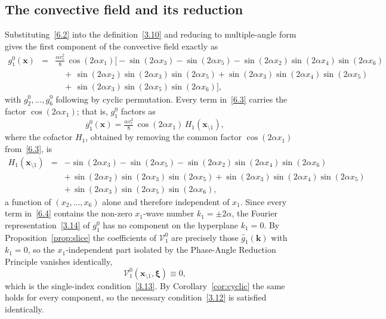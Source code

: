 \documentclass[11pt]{jfm}
\numberwithin{equation}{section}
\begin{document}
\subsection{The convective field and its reduction}
Substituting~\eqref{6.2} into the definition~\eqref{3.10} and reducing to multiple-angle form
gives the first component of the convective field exactly as
\begin{eqnarray}
\label{6.3}
g_1^0(\boldsymbol{x}) &=& \frac{\alpha v_r^2}{8}\,\cos(2\alpha x_1)\Big[
-\sin(2\alpha x_3)-\sin(2\alpha x_5)
-\sin(2\alpha x_2)\sin(2\alpha x_4)\sin(2\alpha x_6)\nonumber\\
&&\quad+\,\sin(2\alpha x_2)\sin(2\alpha x_3)\sin(2\alpha x_5)
+\sin(2\alpha x_3)\sin(2\alpha x_4)\sin(2\alpha x_5)\nonumber\\
&&\quad+\,\sin(2\alpha x_3)\sin(2\alpha x_5)\sin(2\alpha x_6)\Big],
\end{eqnarray}
with $g_2^0,\dots,g_6^0$ following by cyclic permutation. Every term in~\eqref{6.3} carries the
factor $\cos(2\alpha x_1)$; that is, $g_1^0$ factors as
\begin{equation}
\label{6.4}
g_1^0(\boldsymbol{x}) = \tfrac{\alpha v_r^2}{8}\,\cos(2\alpha x_1)\,
H_1(\boldsymbol{x}_{\setminus 1}),
\end{equation}
where the cofactor $H_1$, obtained by removing the common factor $\cos(2\alpha x_1)$
from~\eqref{6.3}, is
\begin{eqnarray}
\label{6.5}
H_1(\boldsymbol{x}_{\setminus 1}) &=&
-\sin(2\alpha x_3)-\sin(2\alpha x_5)
-\sin(2\alpha x_2)\sin(2\alpha x_4)\sin(2\alpha x_6)\nonumber\\
&&+\,\sin(2\alpha x_2)\sin(2\alpha x_3)\sin(2\alpha x_5)
+\sin(2\alpha x_3)\sin(2\alpha x_4)\sin(2\alpha x_5)\nonumber\\
&&+\,\sin(2\alpha x_3)\sin(2\alpha x_5)\sin(2\alpha x_6),
\end{eqnarray}
a function of $(x_2,\dots,x_6)$ alone and therefore independent of $x_1$. Since every term in~\eqref{6.4} contains the non-zero $x_1$-wave number $k_1=\pm2\alpha$, the
Fourier representation~\eqref{3.14} of $g_1^0$ has no component on the hyperplane $k_1=0$. By
Proposition~\ref{prop:slice} the coefficients of $\mathcal{V}_1^0$ are precisely those
$\widehat{g}_1(\boldsymbol{k})$ with $k_1=0$, so the $x_1$-independent part isolated by the
Phase-Angle Reduction Principle vanishes identically,
\begin{equation}
\label{6.6}
\mathcal{V}_1^0(\boldsymbol{x}_{\setminus 1}, \boldsymbol{\xi}) \equiv 0,
\end{equation}
which is the single-index condition~\eqref{3.13}. By Corollary~\ref{cor:cyclic} the same holds for
every component, so the necessary condition~\eqref{3.12} is satisfied identically.
\end{document}
